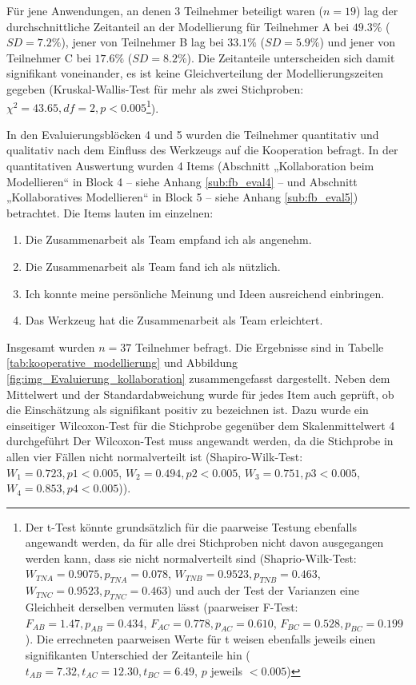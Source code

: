 Für jene Anwendungen, an denen 3 Teilnehmer beteiligt waren ($n=19$) lag der durchschnittliche Zeitanteil an der Modellierung für Teilnehmer A bei $49.3\%$ ($SD=7.2\%$), jener von Teilnehmer B lag bei $33.1\%$ ($SD=5.9\%$) und jener von Teilnehmer C bei $17.6\%$ ($SD=8.2\%$). Die Zeitanteile unterscheiden sich damit signifikant voneinander, es ist keine Gleichverteilung der Modellierungszeiten gegeben (Kruskal-Wallis-Test für mehr als zwei Stichproben: $\chi^{2}=43.65, df=2, p<0.005$\footnote{Der t-Test könnte grundsätzlich für die paarweise Testung ebenfalls angewandt werden, da für alle drei Stichproben nicht davon ausgegangen werden kann, dass sie nicht normalverteilt sind (Shaprio-Wilk-Test: $W_{TN A}=0.9075, p_{TN A}=0.078$, $W_{TN B}=0.9523, p_{TN B}=0.463$, $W_{TN C}=0.9523, p_{TN C}=0.463$) und auch der Test der Varianzen eine Gleichheit derselben vermuten lässt (paarweiser F-Test: $F_{AB}=1.47, p_{AB}=0.434$, $F_{AC}=0.778, p_{AC}=0.610$, $F_{BC}=0.528, p_{BC}=0.199$). Die errechneten paarweisen Werte für t weisen ebenfalls jeweils einen signifikanten Unterschied der Zeitanteile hin ($t_{AB}=7.32, t_{AC}=12.30, t_{BC}=6.49$, $p$ jeweils $<0.005$)}).

In den Evaluierungsblöcken 4 und 5 wurden die Teilnehmer quantitativ und qualitativ nach dem Einfluss des Werkzeugs auf die Kooperation befragt. In der quantitativen Auswertung wurden 4 Items (Abschnitt „Kollaboration beim Modellieren“ in Block 4 -- siehe Anhang \ref{sub:fb_eval4} -- und Abschnitt „Kollaboratives Modellieren“ in Block 5 -- siehe Anhang \ref{sub:fb_eval5}) betrachtet. Die Items lauten im einzelnen:

\begin{enumerate}
	\item Die Zusammenarbeit als Team empfand ich als angenehm.
	\item Die Zusammenarbeit als Team fand ich als nützlich.
	\item Ich konnte meine persönliche Meinung und Ideen ausreichend einbringen.
	\item Das Werkzeug hat die Zusammenarbeit als Team erleichtert.
\end{enumerate}

Insgesamt wurden $n=37$ Teilnehmer befragt. Die Ergebnisse sind in Tabelle \ref{tab:kooperative_modellierung} und Abbildung \ref{fig:img_Evaluierung_kollaboration} zusammengefasst dargestellt. Neben dem Mittelwert und der Standardabweichung wurde für jedes Item auch geprüft, ob die Einschätzung als signifikant positiv zu bezeichnen ist. Dazu wurde ein einseitiger Wilcoxon-Test für die Stichprobe gegenüber dem Skalenmittelwert 4 durchgeführt {Der Wilcoxon-Test muss angewandt werden, da die Stichprobe in allen vier Fällen nicht normalverteilt ist (Shapiro-Wilk-Test: $W_{1}=0.723, p{1}<0.005$, $W_{2}=0.494, p{2}<0.005$, $W_{3}=0.751, p{3}<0.005$, $W_{4}=0.853, p{4}<0.005$)}).

